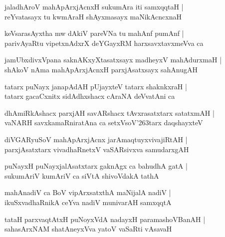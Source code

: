 \documentclass[twoside,12pt,openright]{book}
\def\S{\char'263}
\newcounter{shloka}[chapter]
\begin{document}
\begin{shloka}
jaladhAroV mahApArxjAcnxH sukumAra iti samxqqtaH |\\
reYvatasayx tu kwmAraH shAyxmasayx maNikAcncxnaH
\end{shloka}

\begin{shloka}
keVsarasAyxtha mw dAkiV pareVNa tu mahAnf pumAnf |\\
parivAyaRtu vipetxnAdxrX deYGayxRM harxsavxtavxmeVva ca 
\end{shloka}

\begin{shloka}
jamUbxdivxVpana saknAKxyXtasatxsayx madheyxV mahAdurxmaH |\\
shAkoV nAma mahApArxjAcnxH parxjAsatxsayx sahAnugAH 
\end{shloka}

\begin{shloka}
tatarx puNayx janapAdAH  pUjayxteV tatarx shaknkxraH |\\
tatarx gacaCxnitx sidAdhxshacx cAraNA deVvatAni ca
\end{shloka}

\begin{shloka}
dhAmiRkAshacx parxjAH savARshacx tAvxrasatxtarx satatxmAH |\\
vaNARH savxkamaRniratAna ca setxVsoV\S tarx daqshayxteV
\end{shloka}

\begin{shloka}
diVGARyuSoV mahApArxjAcnx jarAmaqtuyxvivajiRtAH |\\
parxjAsatxtarx vivadhaRnetxV vaSARsivxva samudarxgAH
\end{shloka}


\begin{shloka}
puNayxH puNayxjalAsatxtarx gaknAgx ca bahudhA gatA |\\
sukumAriV kumAriV ca siVtA shivoVdakA tathA
\end{shloka}

\begin{shloka}
mahAnadiV ca BoV vipArxsatxthA maNijalA nadiV |\\
ikuSxvadhaRnikA ceYva nadiV munivarAH samxqqtA
\end{shloka}

\begin{shloka}
tataH parxvaqtAtxH puNoyxVdA nadayxH paramashoVBanAH |\\
sahasArxNAM shatAneyxVva yatoV vaSaRti vAsavaH 
\end{shloka}
\end{document}
